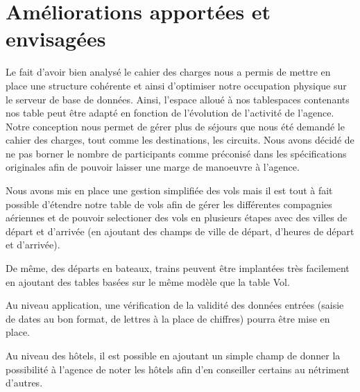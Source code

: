 \section{Am\'eliorations apport\'ees et envisag\'ees}

Le fait d'avoir bien analys\'e le cahier des charges nous a permis de mettre en place une structure coh\'erente et ainsi d'optimiser notre occupation physique sur le serveur de base de donn\'ees.
Ainsi, l'espace allou\'e \`a nos tablespaces contenants nos table peut \^etre adapt\'e en fonction de l'\'evolution de l'activit\'e de l'agence.\\

Notre conception nous permet de g\'erer plus de s\'ejours que nous \'et\'e demand\'e le cahier des charges, tout comme les destinations, les circuits.
Nous avons d\'ecid\'e de ne pas borner le nombre de participants comme pr\'econis\'e dans les sp\'ecifications originales afin de pouvoir laisser une marge de manoeuvre \`a l'agence.

Nous avons mis en place une gestion simplifi\'ee des vols mais  il est tout \`a fait possible d'\'etendre notre table de vols afin de g\'erer les diff\'erentes compagnies a\'eriennes et de pouvoir selectioner des vols en plusieurs \'etapes avec des villes de d\'epart et d'arriv\'ee (en ajoutant des champs de ville de d\'epart, d'heures de d\'epart et d'arriv\'ee).

De m\^eme, des d\'eparts en bateaux, trains peuvent \^etre implant\'ees tr\`es facilement en ajoutant des tables bas\'ees sur le m\^eme mod\`ele que la table Vol.

Au niveau application, une v\'erification de la validit\'e des donn\'ees entr\'ees (saisie de dates au bon format, de lettres \`a la place de chiffres) pourra \^etre mise en place.

Au niveau des h\^otels, il est possible en ajoutant un simple champ de donner la possibilit\'e \`a l'agence de noter les h\^otels afin d'en conseiller certains au n\'etriment d'autres.
